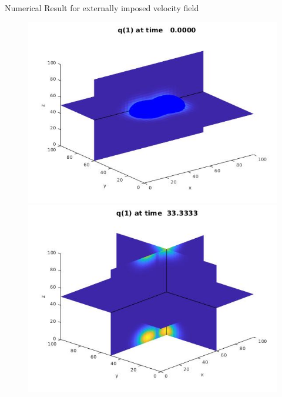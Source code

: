     

     \begin{frame}{Numerical Result for externally imposed velocity field}
    	\scriptsize
    	\begin{figure}[H]
    		\centering
    		\begin{minipage}{0.4\textwidth}
    			\includegraphics[scale=0.21]{Bilder_3D/2Glocken_wxi_wyj_wzi_2Cluster_t=0}
    		\end{minipage}
    		\hfill 
    		\begin{minipage}{0.4\textwidth}
    			\includegraphics[scale=0.21]{Bilder_3D/2Glocken_wxi_wyj_wzi_2Cluster_t=33}

\end{minipage}
\end{figure}
\end{frame}

